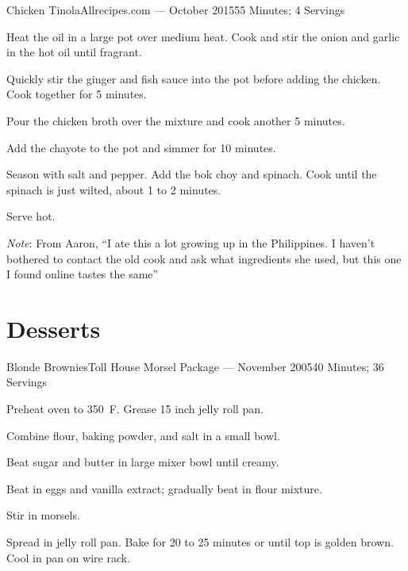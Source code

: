 \documentclass{article}
\begin{document}
\begin{recipe}{Chicken Tinola}{Allrecipes.com --- October 2015}{55 Minutes; 4 Servings}

    Heat the oil in a large pot over medium heat. Cook and stir the onion and garlic in the hot oil until fragrant.

    Quickly stir the ginger and fish sauce into the pot before adding the chicken. Cook together for 5 minutes.

    Pour the chicken broth over the mixture and cook another 5 minutes.

    Add the chayote to the pot and simmer for 10 minutes.

    Season with salt and pepper. Add the bok choy and spinach. Cook until the spinach is just wilted, about 1 to 2 minutes.

    \newstep
    Serve hot.

    \freeform
    \emph{Note}: From Aaron, ``I ate this a lot growing up in the Philippines. I haven't bothered to contact the old cook and ask what ingredients she used, but this one I found online tastes the same''


\end{recipe}


\section{Desserts}

\begin{recipe}{Blonde Brownies}{Toll House Morsel Package --- November 2005}{40 Minutes; 36 Servings}

   \newstep
   Preheat oven to 350\ \0F. Grease 15 inch jelly roll pan.

   Combine flour, baking powder, and salt in a small bowl.

   Beat sugar and butter in large mixer bowl until creamy.

   Beat in eggs and vanilla extract; gradually beat in flour mixture.

   Stir in morsels.

   \newstep
   Spread in jelly roll pan.  Bake for 20 to 25 minutes or until top is golden brown.  Cool in pan on wire rack.

\end{recipe}
\end{document}
